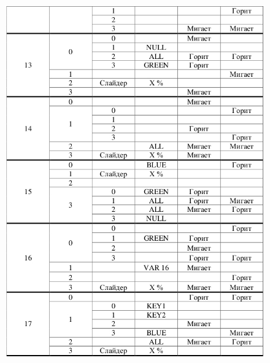 \begin{figure}[H]
\begin{center}
\includegraphics[scale=0.7]{Image/93.jpg} 
\end{center}
\end{figure}